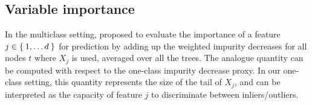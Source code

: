 \subsection{Variable importance}
In the multiclass setting, \citet{Breiman2001} proposed to evaluate the
importance of a feature $j \in \Set{1,\ldots d}$ for prediction by
adding up the weighted impurity decreases 
for all nodes $t$ where $X_j$ is used, averaged over all the trees. The
analogue quantity can be computed with respect to the one-class impurity
decrease proxy.
In our one-class setting, this quantity represents the size of the tail of
$X_j$, and can be interpreted as the capacity of feature $j$ to discriminate
between inliers/outliers.
